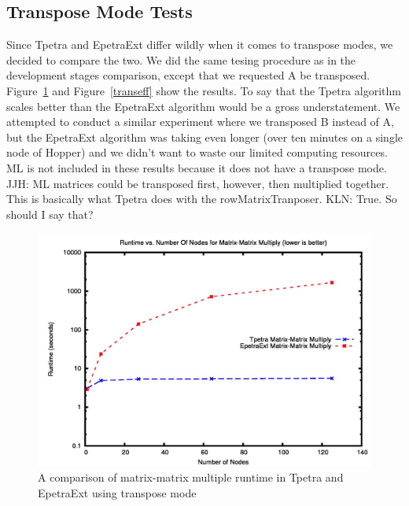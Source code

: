 \documentclass{article}
\newcommand{\JJH}[1]{\textcolor{jhuGreen}{JJH: #1}}
\newcommand{\KLN}[1]{\textcolor{klnBlue}{KLN: #1}}
\begin{document}
\subsection{Transpose Mode Tests}
Since Tpetra and EpetraExt differ wildly when it comes to transpose modes, we decided to compare the two. We did the same
tesing procedure as in the development stages comparison, except that we requested A be transposed. Figure~\ref{transtime}
and Figure~\ref{transeff} show the results. To say that the Tpetra algorithm scales better than the EpetraExt algorithm
would be a gross understatement. We attempted to conduct a similar experiment where we transposed B instead of A, 
but the EpetraExt algorithm was taking even longer (over ten minutes on a single node of Hopper) and we didn't want to 
waste our limited computing resources. ML is not included in these results because it does not have a transpose mode.
\JJH{ML matrices could be transposed first, however, then multiplied together.  This is basically what Tpetra does with
the rowMatrixTranposer.}
\KLN{True. So should I say that?}

\begin{figure}
\includegraphics[scale=.4]{atranstime.jpg}
\caption[Time Comparison]{A comparison of matrix-matrix multiple runtime in Tpetra and EpetraExt using transpose mode}
\label{transtime}
\end{figure}
\end{document}
